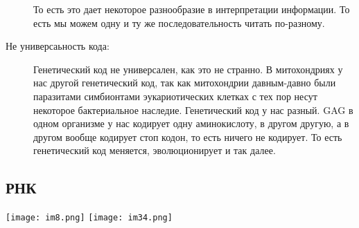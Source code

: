 \begin{description}
То есть это дает некоторое разнообразие в интерпретации информации. 
То есть мы можем одну и ту же последовательность читать по-разному. 

\item[Не универсаьность кода:]
Генетический код не универсален, как это не странно. В митохондриях
у нас другой генетический код, так как митохондрии давным-давно были 
паразитами симбионтами эукариотических клетках с тех 
пор несут некоторое бактериальное наследие. Генетический код 
у нас разный. GAG в одном организме у нас кодирует 
одну аминокислоту, в другом другую, а в другом вообще кодирует 
стоп кодон, то есть ничего не кодирует. То есть 
генетический код меняется, эволюционирует и 
так далее.

\end{description}

\subsection{РНК}
\texttt{[image: im8.png]}
\texttt{[image: im34.png]}

